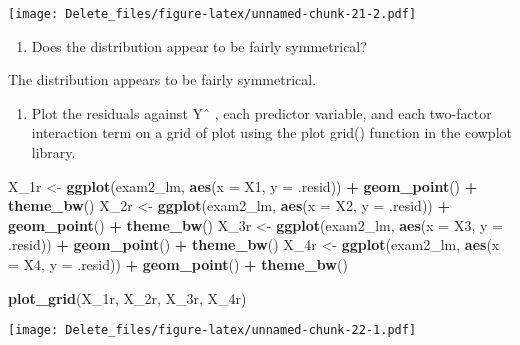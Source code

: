 \documentclass[
]{article}
\newenvironment{Shaded}{\begin{snugshade}}{\end{snugshade}}
\newcommand{\AttributeTok}[1]{\textcolor[rgb]{0.13,0.29,0.53}{#1}}
\newcommand{\FunctionTok}[1]{\textcolor[rgb]{0.13,0.29,0.53}{\textbf{#1}}}
\newcommand{\NormalTok}[1]{#1}
\newcommand{\OtherTok}[1]{\textcolor[rgb]{0.56,0.35,0.01}{#1}}
\newcommand{\SpecialCharTok}[1]{\textcolor[rgb]{0.81,0.36,0.00}{\textbf{#1}}}
\providecommand{\tightlist}{%
  \setlength{\itemsep}{0pt}\setlength{\parskip}{0pt}}
\begin{document}
\texttt{[image: Delete\_files/figure-latex/unnamed-chunk-21-2.pdf]}

\begin{enumerate}
\def\labelenumi{(\alph{enumi})}
\setcounter{enumi}{6}
\tightlist
\item
  Does the distribution appear to be fairly symmetrical?
\end{enumerate}

The distribution appears to be fairly symmetrical.

\begin{enumerate}
\def\labelenumi{(\alph{enumi})}
\setcounter{enumi}{7}
\tightlist
\item
  Plot the residuals against Yˆ , each predictor variable, and each
  two-factor interaction term on a grid of plot using the plot grid()
  function in the cowplot library.
\end{enumerate}

\begin{Shaded}
\begin{Highlighting}[]
\NormalTok{X\_1r }\OtherTok{\textless{}{-}} \FunctionTok{ggplot}\NormalTok{(exam2\_lm, }\FunctionTok{aes}\NormalTok{(}\AttributeTok{x =}\NormalTok{ X1, }\AttributeTok{y =}\NormalTok{ .resid)) }\SpecialCharTok{+} \FunctionTok{geom\_point}\NormalTok{() }\SpecialCharTok{+} \FunctionTok{theme\_bw}\NormalTok{()}
\NormalTok{X\_2r }\OtherTok{\textless{}{-}} \FunctionTok{ggplot}\NormalTok{(exam2\_lm, }\FunctionTok{aes}\NormalTok{(}\AttributeTok{x =}\NormalTok{ X2, }\AttributeTok{y =}\NormalTok{ .resid)) }\SpecialCharTok{+} \FunctionTok{geom\_point}\NormalTok{() }\SpecialCharTok{+} \FunctionTok{theme\_bw}\NormalTok{()}
\NormalTok{X\_3r }\OtherTok{\textless{}{-}} \FunctionTok{ggplot}\NormalTok{(exam2\_lm, }\FunctionTok{aes}\NormalTok{(}\AttributeTok{x =}\NormalTok{ X3, }\AttributeTok{y =}\NormalTok{ .resid)) }\SpecialCharTok{+} \FunctionTok{geom\_point}\NormalTok{() }\SpecialCharTok{+} \FunctionTok{theme\_bw}\NormalTok{()}
\NormalTok{X\_4r }\OtherTok{\textless{}{-}} \FunctionTok{ggplot}\NormalTok{(exam2\_lm, }\FunctionTok{aes}\NormalTok{(}\AttributeTok{x =}\NormalTok{ X4, }\AttributeTok{y =}\NormalTok{ .resid)) }\SpecialCharTok{+} \FunctionTok{geom\_point}\NormalTok{() }\SpecialCharTok{+} \FunctionTok{theme\_bw}\NormalTok{()}

\FunctionTok{plot\_grid}\NormalTok{(X\_1r, X\_2r, X\_3r, X\_4r)}
\end{Highlighting}
\end{Shaded}

\texttt{[image: Delete\_files/figure-latex/unnamed-chunk-22-1.pdf]}
\end{document}
